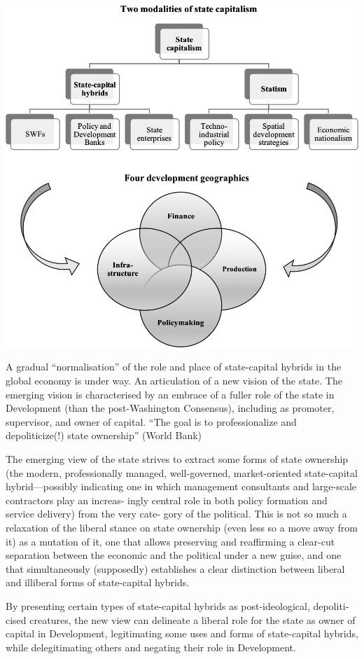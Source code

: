 \documentclass[
]{book}
\begin{document}
\includegraphics{fig/state_capitalism_development_regime.png}

A gradual ``normalisation'' of the role and place of state-capital hybrids in the
global economy is under way.
An articulation of a new vision of the state.
The emerging vision is characterised by an embrace of a fuller
role of the state in Development (than the post-Washington Consensus), including
as promoter, supervisor, and owner of capital.
``The goal is to professionalize and
depoliticize(!) state ownership'' (World Bank)

The emerging view of
the state strives to extract some forms of state ownership (the modern, professionally
managed, well-governed, market-oriented state-capital hybrid---possibly indicating
one in which management consultants and large-scale contractors play an increas-
ingly central role in both policy formation and service delivery) from the very cate-
gory of the political. This is not so much a relaxation of the liberal stance on state
ownership (even less so a move away from it) as a mutation of it, one that allows
preserving and reaffirming a clear-cut separation between the economic and the
political under a new guise, and one that simultaneously (supposedly) establishes a
clear distinction between liberal and illiberal forms of state-capital hybrids.

By presenting certain types of state-capital hybrids as post-ideological, depoliti-
cised creatures, the new view can delineate a liberal role for the state as owner of
capital in Development, legitimating some uses and forms of state-capital hybrids,
while delegitimating others and negating their role in Development.
\end{document}
